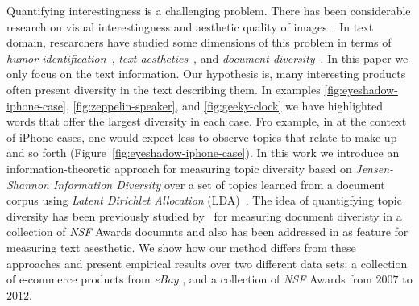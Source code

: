 \documentclass{article} %
\begin{document}
Quantifying interestingness is a challenging problem. There has been considerable research on visual interestingness and aesthetic quality of images~\cite{Datta:2006:SAP:2129560.2129588,Ke:2006:DHF:1153170.1153495,IsolaParikhTorralbaOliva2011,dhar:2011,reinecke2013predicting,journals/pami/WeinshallZHKOABGNPHP12}. 
In text domain, researchers have studied some dimensions of this problem in terms of {\em humor identification}~\cite{Mihalcea:2005:MCL:1220575.1220642,Davidov:2010:SRS:1870568.1870582,Kiddon11,labutov-lipson:2012:ACL2012short}, {\em text aesthetics}~\cite{journals:tamd:Schmidhuber10,N13-1118,ganguly:2014}, and {\em document diversity}~\cite{bache:2013}.  In this paper we only focus on the text information. Our hypothesis is, many interesting products often present diversity in the text describing them. In examples \ref{fig:eyeshadow-iphone-case},
\ref{fig:zeppelin-speaker}, and \ref{fig:geeky-clock} we have highlighted words that offer the largest diversity in each case.
Fro example, in at the context of iPhone cases, one would expect less to observe topics that relate to make up and so forth
(Figure~\ref{fig:eyeshadow-iphone-case}). In this work we introduce an information-theoretic approach for measuring topic diversity based on {\em Jensen-Shannon Information Diversity} over a set of topics learned from a document corpus using {\sl Latent Dirichlet Allocation} (LDA)~\cite{Blei:2003:LDA:944919.944937}. The idea of quantigfying topic diversity has been previously studied by~\cite{bache:2013} for measuring document diveristy in a  collection of {\sl NSF} Awards documnts and also has been addressed in \cite{ganguly:2014} as  feature for measuring text asesthetic. We show how our method differs from these approaches and present empirical results over two different data sets: a collection of e-commerce products from {\sl eBay} , and a collection of {\sl NSF} Awards from $2007$ to $2012$. 
\end{document}
